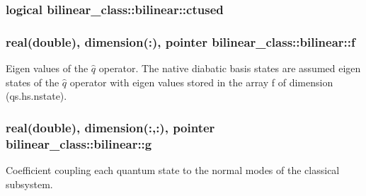 \hypertarget{structbilinear__class_1_1bilinear_aba7556e23595f003ffcf20327dc18f3e}{
\subsubsection[{ctused}]{\setlength{\rightskip}{0pt plus 5cm}logical bilinear\-\_\-class\-::bilinear\-::ctused\hspace{0.3cm}{\ttfamily [private]}}}\label{structbilinear__class_1_1bilinear_aba7556e23595f003ffcf20327dc18f3e}
\hypertarget{structbilinear__class_1_1bilinear_a809699845e36e344b7aeb51642c333ec}{
\subsubsection[{f}]{\setlength{\rightskip}{0pt plus 5cm}real(double), dimension(\-:), pointer bilinear\-\_\-class\-::bilinear\-::f\hspace{0.3cm}{\ttfamily [private]}}}\label{structbilinear__class_1_1bilinear_a809699845e36e344b7aeb51642c333ec}


Eigen values of the $ \hat q $ operator. The native diabatic basis states are assumed eigen states of the $ \hat q $ operator with eigen values stored in the array f of dimension (qs.\-hs.\-nstate). 

\hypertarget{structbilinear__class_1_1bilinear_a910401429e7649dba49acbab872a1b75}{
\subsubsection[{g}]{\setlength{\rightskip}{0pt plus 5cm}real(double), dimension(\-:,\-:), pointer bilinear\-\_\-class\-::bilinear\-::g\hspace{0.3cm}{\ttfamily [private]}}}\label{structbilinear__class_1_1bilinear_a910401429e7649dba49acbab872a1b75}


Coefficient coupling each quantum state to the normal modes of the classical subsystem. 

